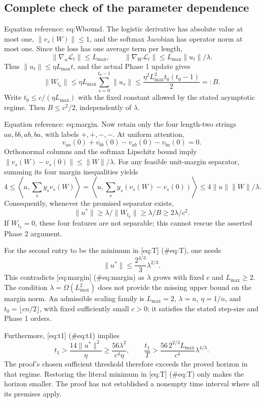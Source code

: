 \documentclass[10pt]{article}
\begin{document}
\subsection*{Complete check of the parameter dependence}
Equation reference: eq:Wbound. The logistic derivative has absolute value at most one, \(\|v_s(W)\|\le1\), and the softmax Jacobian has operator norm at most one. Since the loss has one average term per length, \[\|\nabla_u\mathcal L_t\|\le L_{\max},\qquad
\|\nabla_W\mathcal L_t\|\le L_{\max}\|u_t\|/\lambda.\] Thus \(\|u_t\|\le\eta L_{\max}t\), and the actual Phase 1 update gives \[
\|W_{t_0}\|\le
\eta L_{\max}\sum_{s=0}^{t_0-1}\|u_s\|
\le \frac{\eta^2L_{\max}^2t_0(t_0-1)}2=:B.\] Write \(t_0\le c/(\eta L_{\max})\) with the fixed constant allowed by the stated asymptotic regime. Then \(B\le c^2/2\), independently of \(\lambda\).\par
Equation reference: eq:margin. Now retain only the four length-two strings \(aa,bb,ab,ba\), with labels \(+,+,-,-\). At uniform attention, \[v_{aa}(0)+v_{bb}(0)-v_{ab}(0)-v_{ba}(0)=0.\] Orthonormal columns and the softmax Lipschitz bound imply \(\|v_s(W)-v_s(0)\|\le\|W\|/\lambda\). For any feasible unit-margin separator, summing its four margin inequalities yields \[4\le\left\langle u,\sum_s y_s v_s(W)\right\rangle
=\left\langle u,\sum_s y_s(v_s(W)-v_s(0))\right\rangle
\le4\|u\|\|W\|/\lambda.\] Consequently, whenever the promised separator exists, \[
\|u^\ast\|\ge\lambda/\|W_{t_0}\|
\ge\lambda/B\ge2\lambda/c^2.\] If \(W_{t_0}=0\), these four features are not separable; this cannot rescue the asserted Phase 2 argument.\par
For the second entry to be the minimum in [eq:T] (\#eq:T), one needs \[\|u^\ast\|\le \frac{2^{4/3}}{3}\lambda^{2/3}.\] This contradicts [eq:margin] (\#eq:margin) as \(\lambda\) grows with fixed \(c\) and \(L_{\max}\ge2\). The condition \(\lambda=\Omega(L_{\max}^2)\) does not provide the missing upper bound on the margin norm. An admissible scaling family is \(L_{\max}=2\), \(\lambda=n\), \(\eta=1/n\), and \(t_0=\lfloor cn/2\rfloor\), with fixed sufficiently small \(c>0\); it satisfies the stated step-size and Phase 1 orders.\par
Furthermore, [eq:t1] (\#eq:t1) implies \[t_1>\frac{14\|u^\ast\|^2}{\eta}
\ge\frac{56\lambda^2}{c^4\eta},
\qquad
\frac{t_1}{T}>
\frac{56\,2^{2/3}L_{\max}}{c^4}\lambda^{4/3}.\] The proof’s chosen sufficient threshold therefore exceeds the proved horizon in that regime. Restoring the literal minimum in [eq:T] (\#eq:T) only makes the horizon smaller. The proof has not established a nonempty time interval where all its premises apply.\par
\end{document}
